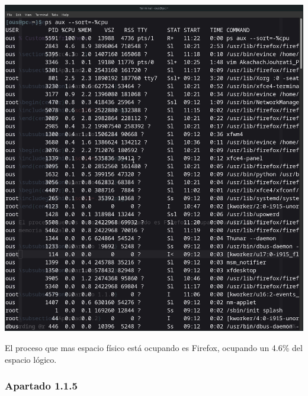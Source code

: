 \documentclass[spanish]{article}
\begin{document}
\begin{center}
\includegraphics[scale=.3]{../img/4.png}
\end{center}

El proceso que mas espacio físico está ocupando es Firefox, ocupando un 4.6\%
del espacio lógico.

\newpage

\subsubsection{Apartado 1.1.5}
\end{document}
